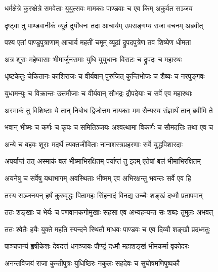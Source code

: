 

\twolineshloka
{धर्मक्षेत्रे कुरुक्षेत्रे समवेताः युयुत्सवः}
{मामकाः पाण्डवाः च एव किम् अकुर्वत सञ्जय}%


\twolineshloka
{दृष्ट्वा तु पाण्डवानीकं व्यूढं दुर्योधनः तदा}
{आचार्यम् उपसङ्गम्य राजा वचनम् अब्रवीत्}%

\twolineshloka
{पश्य एतां पाण्डुपुत्राणाम् आचार्य महतीं चमूम्}
{व्यूढां द्रुपदपुत्रेण तव शिष्येण धीमता}%

\twolineshloka
{अत्र शूराः महेष्वासाः भीमार्जुनसमाः युधि}
{युयुधानः विराटः च द्रुपदः च महारथः}%

\twolineshloka
{धृष्टकेतुः चेकितानः काशिराजः च वीर्यवान्}
{पुरुजित् कुन्तिभोजः च शैब्यः च नरपुङ्गवः}%

\twolineshloka
{युधामन्युः च विक्रान्तः उत्तमौजाः च वीर्यवान्}
{सौभद्रः द्रौपदेयाः च सर्वे एव महारथाः}%

\twolineshloka
{अस्माकं तु विशिष्टाः ये तान् निबोध द्विजोत्तम}
{नायकाः मम सैन्यस्य संज्ञार्थं तान् ब्रवीमि ते}%

\twolineshloka
{भवान् भीष्मः च कर्णः च कृपः च समितिञ्जयः}
{अश्वत्थामा विकर्णः च सौमदत्तिः तथा एव च}%

\twolineshloka
{अन्ये च बहवः शूराः मदर्थे त्यक्तजीविताः}
{नानाशस्त्रप्रहरणाः सर्वे युद्धविशारदाः}%

\twolineshloka
{अपर्याप्तं तत् अस्माकं बलं भीष्माभिरक्षितम्}
{पर्याप्तं तु इदम् एतेषां बलं भीमाभिरक्षितम्}%

\twolineshloka
{अयनेषु च सर्वेषु यथाभागम् अवस्थिताः}
{भीष्मम् एव अभिरक्षन्तु भवन्तः सर्वे एव हि}%

\twolineshloka
{तस्य सञ्जनयन् हर्षं कुरुवृद्धः पितामहः}
{सिंहनादं विनद्य उच्चैः शङ्खं दध्मौ प्रतापवान्}%

\twolineshloka
{ततः शङ्खाः च भेर्यः च पणवानकगोमुखाः}
{सहसा एव अभ्यहन्यन्त सः शब्दः तुमुलः अभवत्}%

\twolineshloka
{ततः श्वेतैः हयैः युक्ते महति स्यन्दने स्थितौ}
{माधवः पाण्डवः च एव दिव्यौ शङ्खौ प्रदध्मतुः}%

\twolineshloka
{पाञ्चजन्यं हृषीकेशः देवदत्तं धनञ्जयः}
{पौण्ड्रं दध्मौ महाशङ्खं भीमकर्मा वृकोदरः}%

\twolineshloka
{अनन्तविजयं राजा कुन्तीपुत्रः युधिष्ठिरः}
{नकुलः सहदेवः च सुघोषमणिपुष्पकौ}%

